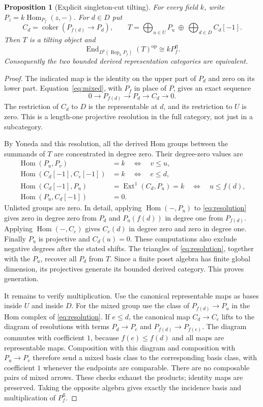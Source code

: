 \documentclass[11pt]{article}
\newtheorem{proposition}[theorem]{Proposition}
\theoremstyle{definition}
\newcommand{\Rep}{\operatorname{Rep}}
\newcommand{\Hom}{\operatorname{Hom}}
\newcommand{\End}{\operatorname{End}}
\newcommand{\Ext}{\operatorname{Ext}}
\newcommand{\Db}{D^b}
\begin{document}
\begin{proposition}[Explicit singleton-cut tilting]\label{prop:tilt}
For every field $k$, write $P_z=k\Hom_{P_f}(z,-)$. For $d\in D$ put
\[
 C_d=\operatorname{coker}(P_{f(d)}\longrightarrow P_d),\qquad
 T=\bigoplus_{u\in U}P_u\ \oplus\ \bigoplus_{d\in D}C_d[-1].
\]
Then $T$ is a tilting object and
\[
 \End_{\Db(\Rep_k P_f)}(T)^{\mathrm{op}}\cong kP_f^{\mathrm{fl}}.
\]
Consequently the two bounded derived representation categories are
equivalent.
\end{proposition}
\begin{proof}
The indicated map is the identity on the upper part of $P_d$ and
zero on its lower part. Equation~\eqref{eq:mixed}, with $P_f$ in
place of $P$, gives an exact sequence
\begin{equation}\label{eq:resolution}
 0\longrightarrow P_{f(d)}\longrightarrow P_d
      \longrightarrow C_d\longrightarrow0.
\end{equation}
The restriction of $C_d$ to $D$ is the representable at $d$, and
its restriction to $U$ is zero. This is a length-one projective
resolution in the full category, not just in a subcategory.

By Yoneda and this resolution, all the derived Hom groups between
the summands of $T$ are concentrated in degree zero. Their degree-zero
values are
\begin{align*}
 \Hom(P_u,P_v)&=k\quad\Longleftrightarrow\quad v\leq u,\\
 \Hom(C_d[-1],C_e[-1])&=k\quad\Longleftrightarrow\quad e\leq d,\\
 \Hom(C_d[-1],P_u)&=\Ext^1(C_d,P_u)
                  =k\quad\Longleftrightarrow\quad u\leq f(d),\\
 \Hom(P_u,C_d[-1])&=0.
\end{align*}
Unlisted groups are zero. In detail, applying $\Hom(-,P_u)$ to
\eqref{eq:resolution} gives zero in degree zero from $P_d$ and
$P_u(f(d))$ in degree one from $P_{f(d)}$.
Applying $\Hom(-,C_e)$ gives $C_e(d)$ in degree zero and zero in
degree one. Finally $P_u$ is projective and $C_d(u)=0$.
These computations also exclude negative degrees after the stated
shifts. The triangles of \eqref{eq:resolution}, together with the
$P_u$, recover all $P_d$ from $T$. Since a finite poset algebra has
finite global dimension, its projectives generate its bounded
derived category. This proves generation.

It remains to verify multiplication. Use the canonical representable
maps as bases inside $U$ and inside $D$. For the mixed group use
the class of $P_{f(d)}\to P_u$ in the Hom complex of
\eqref{eq:resolution}. If $e\leq d$, the canonical map $C_d\to C_e$
lifts to the diagram of resolutions with terms
$P_d\to P_e$ and $P_{f(d)}\to P_{f(e)}$.
The diagram commutes with coefficient $1$, because $f(e)\leq f(d)$
and all maps are representable maps. Composition with this diagram
and composition with $P_u\to P_v$ therefore send a mixed basis class
to the corresponding basis class, with coefficient $1$ whenever
the endpoints are comparable. There are no composable pairs of
mixed arrows. These checks exhaust the products; identity maps are
preserved. Taking the opposite algebra gives exactly the incidence
basis and multiplication of $P_f^{\mathrm{fl}}$.


\end{proof}
\end{document}
